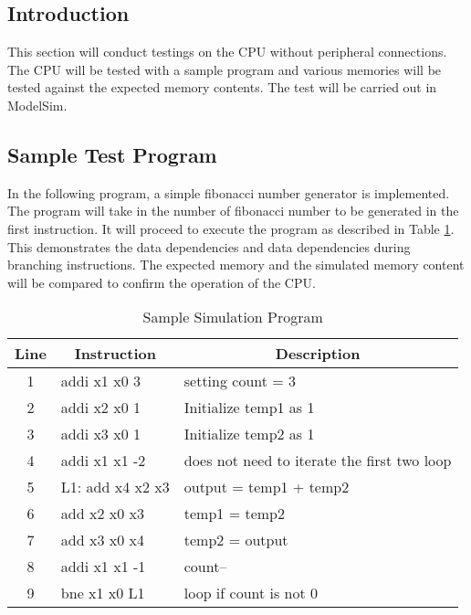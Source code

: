 \subsection{Introduction}
This section will conduct testings on the CPU without peripheral connections.
The CPU will be tested with a sample program and various memories will be tested against the expected memory contents.
The test will be carried out in ModelSim.

\subsection{Sample Test Program}
In the following program, a simple fibonacci number generator is implemented.
The program will take in the number of fibonacci number to be generated in the first instruction.
It will proceed to execute the program as described in Table \ref{program:sample_simulation}.
This demonstrates the data dependencies and data dependencies during branching instructions.
The expected memory and the simulated memory content will be compared to confirm the operation of the CPU.
\begin{table}[!h]
    \centering
    \caption{Sample Simulation Program}
    \label{program:sample_simulation}
    \begin{tabular}{|c|l|l|}
        \hline
        \textbf{Line} & \multicolumn{1}{c|}{\textbf{Instruction}} & \multicolumn{1}{c|}{\textbf{Description}}   \\ \hline
        1             & addi x1 x0 3                              & setting count = 3                           \\ \hline
        2             & addi x2 x0 1                              & Initialize temp1 as 1                       \\ \hline
        3             & addi x3 x0 1                              & Initialize temp2 as 1                       \\ \hline
        4             & addi x1 x1 -2                             & does not need to iterate the first two loop \\ \hline
        5             & L1: add x4 x2 x3                          & output = temp1 + temp2                      \\ \hline
        6             & add x2 x0 x3                              & temp1 = temp2                               \\ \hline
        7             & add x3 x0 x4                              & temp2 = output                              \\ \hline
        8             & addi x1 x1 -1                             & count--                                     \\ \hline
        9             & bne x1 x0 L1                              & loop if count is not 0                      \\ \hline
    \end{tabular}
\end{table}


